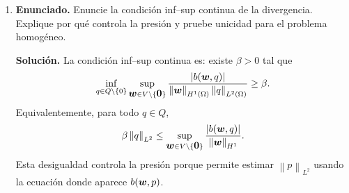 \documentclass[11pt]{article}
\newcommand{\norm}[1]{\left\lVert #1\right\rVert}
\newcommand{\abs}[1]{\left|#1\right|}
\def\vec   #1{\mbox{\boldmath $#1$}{}}
\def\dx{\mbox{\(\,\mathrm{d}x\)}}
\DeclareMathOperator{\dive}{div}
\begin{document}
\begin{enumerate}[label=\textbf{\arabic*.}, leftmargin=*]
\begin{enumerate}[label=(\alph*), leftmargin=*]
    \textbf{Solución.} Las formas ya fueron definidas en (a). Para $a$, por Cauchy--Schwarz,
    \[
    \begin{aligned}
        \abs{a(\vec z,\vec w)}
        &\le
        2\mu\norm{D(\vec z)}_{L^2}\norm{D(\vec w)}_{L^2}
        +\alpha\norm{\vec z}_{L^2}\norm{\vec w}_{L^2}\\
        &\le
        C\norm{\vec z}_{H^1}\norm{\vec w}_{H^1}.
    \end{aligned}
    \]
    Para $b$,
    \[
    \begin{aligned}
        \abs{b(\vec w,q)}
        &=
        \abs{\int_\Omega q\,\dive\vec w\dx}
        \le
        \norm{q}_{L^2}\norm{\dive\vec w}_{L^2}
        \le
        C\norm{q}_{L^2}\norm{\vec w}_{H^1}.
    \end{aligned}
    \]
    Como $\vec w\in H^1_0(\Omega)^d$, Korn entrega
    \[
        \norm{\vec w}_{H^1(\Omega)}
        \le
        C_K\norm{D(\vec w)}_{L^2(\Omega)}.
    \]
    Luego, usando $\mu>0$ y $\alpha\ge0$,
    \[
    \begin{aligned}
        a(\vec w,\vec w)
        &=
        2\mu\norm{D(\vec w)}_{L^2}^2
        +\alpha\norm{\vec w}_{L^2}^2\\
        &\ge
        2\mu\norm{D(\vec w)}_{L^2}^2
        \ge
        c\norm{\vec w}_{H^1}^2.
    \end{aligned}
    \]
    En particular, $a$ es coerciva en todo $V$, luego también en el núcleo solenoidal.

    \item \textbf{Enunciado.} Enuncie la condición inf--sup continua de la divergencia. Explique por qué controla la presión y pruebe unicidad para el problema homogéneo.

    \textbf{Solución.} La condición inf--sup continua es: existe $\beta>0$ tal que
    \[
        \inf_{q\in Q\setminus\{0\}}
        \sup_{\vec w\in V\setminus\{\vec0\}}
        \frac{\abs{b(\vec w,q)}}
        {\norm{\vec w}_{H^1(\Omega)}\norm{q}_{L^2(\Omega)}}
        \ge\beta.
    \]
    Equivalentemente, para todo $q\in Q$,
    \[
        \beta\norm{q}_{L^2}
        \le
        \sup_{\vec w\in V\setminus\{\vec0\}}
        \frac{\abs{b(\vec w,q)}}{\norm{\vec w}_{H^1}}.
    \]
    Esta desigualdad controla la presión porque permite estimar $\norm{p}_{L^2}$ usando la ecuación donde aparece $b(\vec w,p)$.


\end{enumerate}
\end{enumerate}
\end{document}
